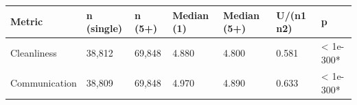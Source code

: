 \begin{tabular}{lllllll}
\toprule
Metric & n (single) & n (5+) & Median (1) & Median (5+) & U/(n1 n2) & p \\
\midrule
Cleanliness & 38,812 & 69,848 & 4.880 & 4.800 & 0.581 & < 1e-300* \\
Communication & 38,809 & 69,848 & 4.970 & 4.890 & 0.633 & < 1e-300* \\
\bottomrule
\end{tabular}
